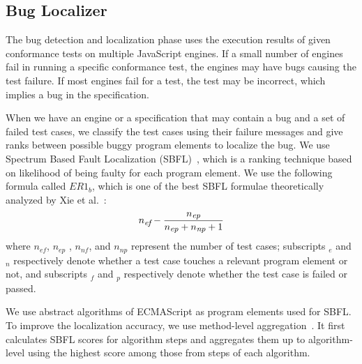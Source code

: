 \subsection{Bug Localizer}

The bug detection and localization phase uses the execution results of
given conformance tests on multiple JavaScript engines.
If a small number of engines fail in running a specific conformance test,
the engines may have bugs causing the test failure.
If most engines fail for a test, the test may be incorrect,
which implies a bug in the specification.

When we have an engine or a specification that may contain a bug and
a set of failed test cases, we classify the test cases using their failure
messages and give ranks between possible buggy program elements to localize the bug.
We use Spectrum Based Fault Localization (SBFL)~\cite{sbfl-survey},
which is a ranking technique based on likelihood of being faulty for each
program element.  We use the following formula called $ER1_b$,
which is one of the best SBFL formulae theoretically analyzed by Xie et al.~\cite{er1b}:
\[
  {n_{\mbox{\emph{\scriptsize ef}}}} -
  {
    {n_{\mbox{\emph{\scriptsize ep}}}}
    \over
    {n_{\mbox{\emph{\scriptsize ep}}} + n_{\mbox{\emph{\scriptsize np}}} + 1}
  }
\]
where $n_{ef}$, $n_{ep}$ , $n_{nf}$, and $n_{np}$ represent the number of test
cases; subscripts ${}_e$ and ${}_n$ respectively denote whether a test case touches a
relevant program element or not, and subscripts ${}_f$ and ${}_p$
respectively denote whether the test case is failed or passed.

We use abstract algorithms of ECMAScript as program elements used for SBFL.
To improve the localization accuracy, we use method-level aggregation~\cite{fluccs}.
It first calculates SBFL scores for algorithm steps and aggregates
them up to algorithm-level using the highest score among those from steps of each algorithm.
